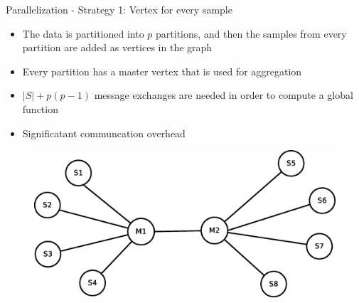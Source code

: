 \documentclass{beamer}
\begin{document}
\begin{frame}{Parallelization - Strategy 1: Vertex for every sample}

\begin{itemize}
\item The data is partitioned into $p$ partitions, and then the samples from every partition are added as vertices in the graph
\item Every partition has a master vertex that is used for aggregation
\item $|S| + p(p-1)$ message exchanges are needed in order to compute a global function
\item Significatant communcation overhead
\end{itemize}

\begin{figure}[!htb]
  \centering
  \includegraphics[scale=0.30]{graph1.eps}
  \label{fig:vs:graph1}
\end{figure}

\end{frame}

\end{document}
